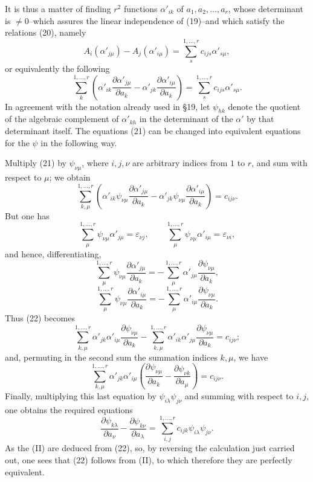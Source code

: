 \documentclass[11pt]{book}
\begin{document}
It is thus a matter of finding $r^2$ functions $\alpha'_{ik}$ of $a_1,a_2,\ldots,a_r$, whose determinant is $\ne0$--which assures the linear independence of (19)--and which satisfy the relations (20), namely
\[
 A_i(\alpha'_{j\mu})-A_j(\alpha'_{i\mu})=\sum\limits_s^{1,\ldots,r} c_{ijs}\alpha'_{s\mu},
\]
or equivalently the following
\begin{equation*}\tag{21}
 \sum\limits_k^{1,\ldots,r}
 \left(\alpha'_{ik}\frac{\partial\alpha'_{j\mu}}{\partial a_k}
      -\alpha'_{jk}\frac{\partial\alpha'_{i\mu}}{\partial a_k}\right)
 =\sum\limits_s^{1,\ldots,r} c_{ijs}\alpha'_{s\mu}.
\end{equation*}
In agreement with the notation already used in \S{}19, let $\psi_{hk}$ denote the quotient of the algebraic complement of $\alpha'_{kh}$ in the determinant of the $\alpha'$ by that determinant itself. The equations (21) can be changed into equivalent equations for the $\psi$ in the following way.

Multiply (21) by $\psi_{\nu\mu}$, where $i,j,\nu$ are arbitrary indices from $1$ to $r$, and sum with respect to $\mu$; we obtain
\begin{equation*}\tag{22}
 \sum\limits_{k,\mu}^{1,\ldots,r}
 \left(\alpha'_{ik}\psi_{\nu\mu}\frac{\partial\alpha'_{j\mu}}{\partial a_k}
      -\alpha'_{jk}\psi_{\nu\mu}\frac{\partial\alpha'_{i\mu}}{\partial a_k}\right)
 =c_{ij\nu}.
\end{equation*}
But one has
\[
 \sum\limits_\mu^{1,\ldots,r}\psi_{\nu\mu}\alpha'_{j\mu}=\varepsilon_{\nu j},
 \qquad
 \sum\limits_\mu^{1,\ldots,r}\psi_{\nu\mu}\alpha'_{i\mu}=\varepsilon_{\nu i},
\]
and hence, differentiating,
\[
 \sum\limits_\mu^{1,\ldots,r}\psi_{\nu\mu}\frac{\partial\alpha'_{j\mu}}{\partial a_k}
 =-\sum\limits_\mu^{1,\ldots,r}\alpha'_{j\mu}\frac{\partial\psi_{\nu\mu}}{\partial a_k},
\]
\[
 \sum\limits_\mu^{1,\ldots,r}\psi_{\nu\mu}\frac{\partial\alpha'_{i\mu}}{\partial a_k}
 =-\sum\limits_\mu^{1,\ldots,r}\alpha'_{i\mu}\frac{\partial\psi_{\nu\mu}}{\partial a_k}.
\]
Thus (22) becomes
\[
 \sum\limits_{k,\mu}^{1,\ldots,r}\alpha'_{jk}\alpha'_{i\mu}\frac{\partial\psi_{\nu\mu}}{\partial a_k}
 -\sum\limits_{k,\mu}^{1,\ldots,r}\alpha'_{ik}\alpha'_{j\mu}\frac{\partial\psi_{\nu\mu}}{\partial a_k}=c_{ij\nu};
\]
and, permuting in the second sum the summation indices $k,\mu$, we have
\[
 \sum\limits_{k,\mu}^{1,\ldots,r}\alpha'_{jk}\alpha'_{i\mu}
 \left(\frac{\partial\psi_{\nu\mu}}{\partial a_k}
      -\frac{\partial\psi_{\nu k}}{\partial a_\mu}\right)=c_{ij\nu}.
\]
Finally, multiplying this last equation by $\psi_{i\lambda}\psi_{j\nu}$ and summing with respect to $i,j$, one obtains the required equations
\begin{equation*}\tag{II}
 \frac{\partial\psi_{k\lambda}}{\partial a_\nu}
 -\frac{\partial\psi_{k\nu}}{\partial a_\lambda}
 =\sum\limits_{i,j}^{1,\ldots,r}c_{ijk}\psi_{i\lambda}\psi_{j\nu}.
\end{equation*}
As the (II) are deduced from (22), so, by reversing the calculation just carried out, one sees that (22) follows from (II), to which therefore they are perfectly equivalent.
\end{document}

